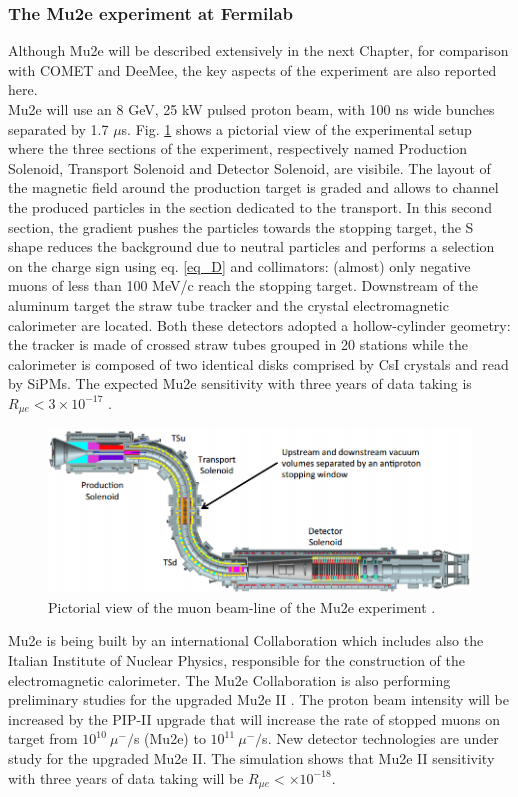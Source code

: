 \documentclass[12pt,a4paper,openright, oneside, titlepage]{book} %
\begin{document}
\subsubsection{The Mu2e experiment at Fermilab}
Although Mu2e will be described extensively in the next Chapter, for comparison with COMET and DeeMee,
the key aspects of the experiment are also reported here.\\
Mu2e will use an 8 GeV, 25 kW pulsed proton beam, with 100 ns wide bunches separated by 1.7 $\mu$s.  
Fig. \ref{_MuonBeamline} shows a pictorial view of the experimental setup 
where the three sections of the experiment, respectively named
Production Solenoid, Transport Solenoid and Detector Solenoid, are visibile.  
The layout of the magnetic field around the production target is graded and allows to channel the produced particles in the section dedicated to the transport. 
In this second section, the gradient pushes the particles towards the stopping target, the S shape reduces the background 
due to neutral particles and performs a selection on the charge sign using eq. \ref{eq_D} and collimators: (almost) only negative muons of less than 100 MeV/c reach the stopping target. Downstream of the aluminum target the straw tube tracker and the crystal electromagnetic calorimeter are located. Both these detectors adopted a hollow-cylinder geometry: 
the tracker is made of crossed straw tubes grouped in 20 stations 
while the calorimeter is composed of two identical disks comprised by CsI crystals and read by SiPMs.
The expected Mu2e sensitivity with three years of data taking is $R_{\mu e}<3\times10^{-17}$ \cite{MTDR}.



\begin{figure}[h!]
\centering
\includegraphics[scale=0.8]{MuonBeamline}
\caption[Mu2e experiment]{Pictorial view of the muon beam-line of the Mu2e experiment \cite{MTDR}.}
\label{_MuonBeamline}
\end{figure}

\noindent
Mu2e is being built by an international Collaboration which includes also the Italian Institute of Nuclear Physics,
responsible for the construction of the electromagnetic calorimeter.
The Mu2e Collaboration is also performing preliminary studies for the upgraded Mu2e II
\cite{Mu2e_II:2018}. 
The proton beam intensity will be increased by the PIP-II upgrade \cite{PIP_II:2018} 
that will increase the rate of stopped muons on target from $10^{10}\ \mu^-/$s (Mu2e) 
to $10^{11}\ \mu^-/$s. New detector technologies are under study for the upgraded Mu2e II.
The simulation shows that Mu2e II
sensitivity with three years of data taking will be $R_{\mu e} < \times10^{-18}$.
\end{document}
